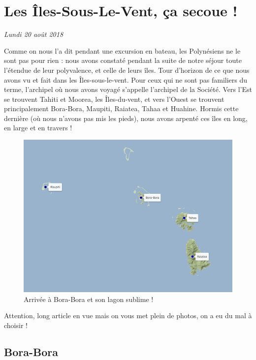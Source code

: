 \hypertarget{les-uxeeles-sous-le-vent-uxe7a-secoue}{%
\section{Les Îles-Sous-Le-Vent, ça secoue
!}\label{les-uxeeles-sous-le-vent-uxe7a-secoue}}

\emph{Lundi 20 août 2018}

Comme on nous l'a dit pendant une excursion en bateau, les Polynésiens
ne le sont pas pour rien : nous avons constaté pendant la suite de notre
séjour toute l'étendue de leur polyvalence, et celle de leurs îles. Tour
d'horizon de ce que nous avons vu et fait dans les Îles-sous-le-vent.
Pour ceux qui ne sont pas familiers du terme, l'archipel où nous avons
voyagé s'appelle l'archipel de la Société. Vers l'Est se trouvent Tahiti
et Moorea, les Îles-du-vent, et vers l'Ouest se trouvent principalement
Bora-Bora, Maupiti, Raiatea, Tahaa et Huahine. Hormis cette dernière (où
nous n'avons pas mis les pieds), nous avons arpenté ces îles en long, en
large et en travers !

\begin{figure}
\centering
\includegraphics{maps/Polynesie2_1.png}
\caption{Arrivée à Bora-Bora et son lagon sublime !}
\end{figure}

Attention, long article en vue mais on vous met plein de photos, on a eu
du mal à choisir !

\hypertarget{bora-bora}{%
\subsection{Bora-Bora}\label{bora-bora}}

